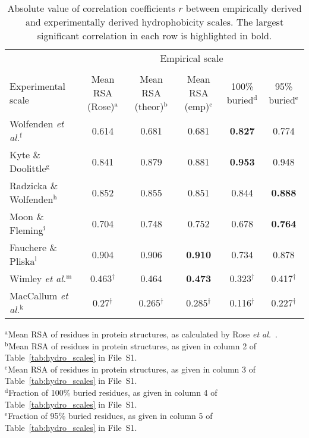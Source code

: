 \documentclass[11pt]{article}
\begin{document}
\begin{table}[H]
\caption{\label{tab:Corr}Absolute value of correlation coefficients $r$ between empirically derived and experimentally derived hydrophobicity scales. The largest significant correlation in each row is highlighted in bold.}
\begin{center}
\footnotesize
\begin{tabular}{lccccc}
 & \multicolumn{5}{c}{Empirical scale} \\ \cline{2-6}\\[-2ex]
Experimental scale & Mean RSA (Rose)$^\text{a}$ & Mean RSA (theor)$^\text{b}$ & Mean RSA (emp)$^\text{c}$ & 100\% buried$^\text{d}$ & 95\% buried$^\text{e}$\\
\hline
Wolfenden \emph{et al.}$^\text{f}$ & 0.614 & 0.681 & 0.681 & \textbf{0.827} & 0.774 \\
Kyte \& Doolittle$^\text{g}$ & 0.841 & 0.879 & 0.881 & \textbf{0.953} & 0.948 \\
Radzicka \& Wolfenden$^\text{h}$ & 0.852 & 0.855 & 0.851 & 0.844 & \textbf{0.888} \\
Moon \& Fleming$^\text{i}$ & 0.704 & 0.748 & 0.752 & 0.678 & \bf{0.764} \\
Fauchere \& Pliska$^\text{l}$ & 0.904 & 0.906 & \textbf{0.910} & 0.734 & 0.878 \\
Wimley \emph{et al.}$^\text{m}$ & 0.463$^\dagger$ & 0.464 & \textbf{0.473} & 0.323$^\dagger$ & 0.417$^\dagger$ \\
MacCallum \emph{et al.}$^\text{k}$ & 0.27$^\dagger$ & 0.265$^\dagger$ & 0.285$^\dagger$ & 0.116$^\dagger$ & 0.227$^\dagger$ \\
\hline
\end{tabular}
\end{center}
{\footnotesize
\begin{raggedright}
$^\text{a}$Mean RSA of residues in protein structures, as calculated by Rose \emph{et al.}~\cite{Rose1985}.\\
$^\text{b}$Mean RSA of residues in protein structures, as given in column 2 of Table~\ref{tab:hydro_scales} in File~S1.\\ 
$^\text{c}$Mean RSA of residues in protein structures, as given in column 3 of Table~\ref{tab:hydro_scales} in File~S1.\\
$^\text{d}$Fraction of 100\% buried residues, as given in column 4 of Table~\ref{tab:hydro_scales} in File~S1.\\
$^\text{e}$Fraction of 95\% buried residues, as given in column 5 of Table~\ref{tab:hydro_scales} in File~S1.\\

\end{raggedright}}
\end{table}
\end{document}

